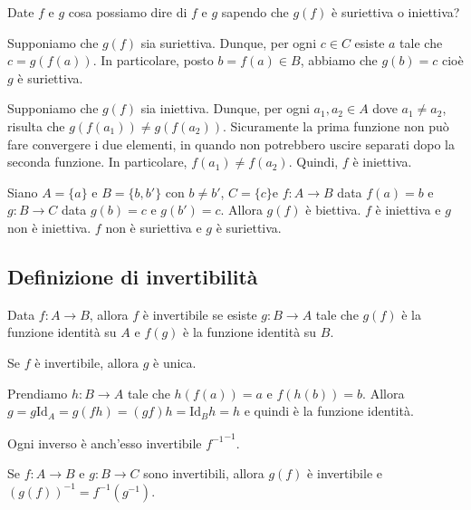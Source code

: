 \documentclass[a4paper]{article}
\begin{document}
Date \(f\) e \(g\) cosa possiamo dire di \(f\) e \(g\) sapendo che \(g(f)\) è suriettiva o iniettiva?

Supponiamo che \(g(f)\) sia suriettiva.
Dunque, per ogni \(c\in C\) esiste \(a\) tale che \(c=g(f(a))\).
In particolare, posto \(b=f(a) \in B\), abbiamo che \(g(b)=c\) cioè \(g\) è suriettiva.

Supponiamo che \(g(f)\) sia iniettiva.
Dunque, per ogni \(a_1, a_2 \in A\) dove \(a_1 \neq a_2\), risulta che \(g(f(a_1)) \neq g(f(a_2))\).
Sicuramente la prima funzione non può fare convergere i due elementi, in quando non potrebbero uscire separati
dopo la seconda funzione.
In particolare, \(f(a_1) \neq f(a_2)\). Quindi, \(f\) è iniettiva.

\begin{snippetexample}{}
    Siano \(A = \{a\}\) e \(B=\{b, b'\}\) con \(b\neq b'\), \(C=\{c\}\)e \(f \colon A \to B\)
    data \(f(a)=b\) e \(g\colon B \to C\) data \(g(b) = c\) e \(g(b') = c\).
    Allora \(g(f)\) è biettiva. \(f\) è iniettiva e \(g\) non è iniettiva.
    \(f\) non è suriettiva e \(g\) è suriettiva.
\end{snippetexample}

\subsection{Definizione di invertibilità}

Data \(f\colon A \to B\), allora \(f\) è invertibile se esiste \(g\colon B \to A\)
tale che \(g(f)\) è la funzione identità su \(A\) e \(f(g)\) è la funzione identità su \(B\).

\begin{snippetproposition}{}
    Se \(f\) è invertibile, allora \(g\) è unica.
\end{snippetproposition}

\begin{snippetproof}{}
    Prendiamo \(h\colon B \to A\) tale che \(h(f(a)) = a\) e \(f(h(b)) = b\).
    Allora \(g = g\text{Id}_A = g(fh) = (gf)h = \text{Id}_Bh=h\) e quindi è la funzione identità.
\end{snippetproof}

\begin{snippetproposition}{}
    Ogni inverso è anch'esso invertibile \({f^{-1}}^{-1}\).
\end{snippetproposition}

\begin{snippetproposition}{}
    Se \(f\colon A \to B\) e \(g\colon B \to C\) sono invertibili, allora \(g(f)\)
    è invertibile e \({\left(g(f)\right)}^{-1} = f^{-1}(g^{-1})\).
\end{snippetproposition}
\end{document}
